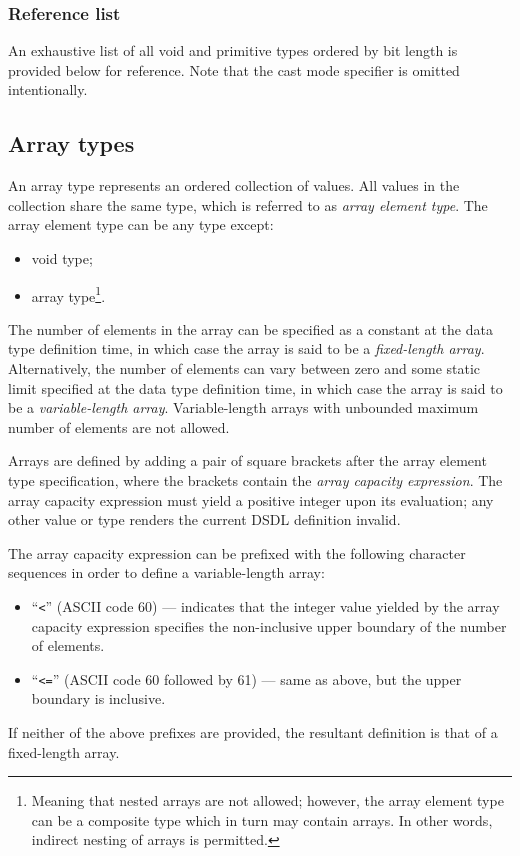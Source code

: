 \subsubsection{Reference list}

An exhaustive list of all void and primitive types
ordered by bit length is provided below for reference.
Note that the cast mode specifier is omitted intentionally.

\immediate{}
\immediate{}
\immediate

\subsection{Array types}

An array type represents an ordered collection of values.
All values in the collection share the same type, which is referred to as \emph{array element type}.
The array element type can be any type except:
\begin{itemize}
    \item void type;
    \item array type\footnote{Meaning that nested arrays are not allowed;
    however, the array element type can be a composite type which in turn may contain arrays.
    In other words, indirect nesting of arrays is permitted.}.
\end{itemize}

The number of elements in the array can be specified as a constant at the data type definition time,
in which case the array is said to be a \emph{fixed-length array}.
Alternatively, the number of elements can vary between zero and some static limit specified
at the data type definition time,
in which case the array is said to be a \emph{variable-length array}.
Variable-length arrays with unbounded maximum number of elements are not allowed.

Arrays are defined by adding a pair of square brackets after the array element type specification,
where the brackets contain the \emph{array capacity expression}.
The array capacity expression must yield a positive integer upon its evaluation;
any other value or type renders the current DSDL definition invalid.

The array capacity expression can be prefixed with the following character sequences in order to define
a variable-length array:
\begin{itemize}
    \item ``\verb|<|'' (ASCII code 60) --- indicates that the integer value yielded by the array capacity expression
    specifies the non-inclusive upper boundary of the number of elements.

    \item ``\verb|<=|'' (ASCII code 60 followed by 61) --- same as above, but the upper boundary is inclusive.
\end{itemize}
If neither of the above prefixes are provided, the resultant definition is that of a fixed-length array.

